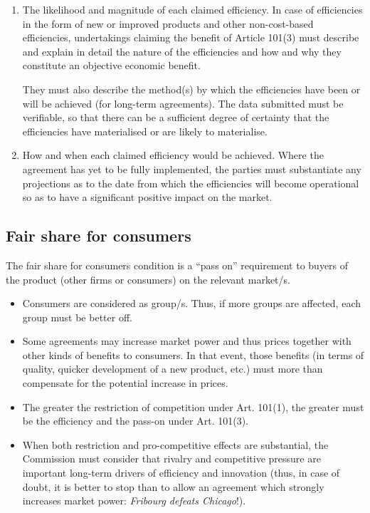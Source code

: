 \begin{enumerate}[label=\alph*.]
            \item The likelihood and magnitude of each claimed efficiency. In case of efficiencies in the form of new or improved products and other non-cost-based efficiencies, undertakings claiming the benefit of Article 101(3) must describe and explain in detail the nature of the efficiencies and how and why they constitute an objective economic benefit.
            
            They must also describe the method(s) by which the efficiencies have been or will be achieved (for long-term agreements). The data submitted must be verifiable, so that there can be a sufficient degree of certainty that the efficiencies have materialised or are likely to materialise.
            
            \item How and when each claimed efficiency would be achieved. Where the agreement has yet to be fully implemented, the parties must substantiate any projections as to the date from which the efficiencies will become operational so as to have a significant positive impact on the market.
        \end{enumerate}

    \subsection{Fair share for consumers}

        The fair share for consumers condition is a “pass on” requirement to buyers of the product (other firms or consumers) on the relevant market/s.

        \begin{itemize}
            \item Consumers are considered as group/s. Thus, if more groups are affected, each group must be better off.
            \item Some agreements may increase market power and thus prices together with other kinds of benefits to consumers. In that event, those benefits (in terms of quality, quicker development of a new product, etc.) must more than compensate for the potential increase in prices.
            \item The greater the restriction of competition under Art. 101(1), the greater must be the efficiency and the pass-on under Art. 101(3).
            \item When both restriction and pro-competitive effects are substantial, the Commission must consider that rivalry and competitive pressure are important long-term drivers of efficiency and innovation (thus, in case of doubt, it is better to stop than to allow an agreement which strongly increases market power: \textit{Fribourg defeats Chicago}!).
        \end{itemize}
        
